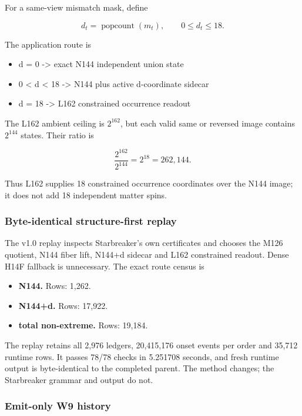 For a same-view mismatch mask, define

\[
d_t=\operatorname{popcount}(m_t),\qquad0\le d_t\le18.
\]

The application route is

\begin{itemize}
\tightlist
\item
  d = 0 -\textgreater{} exact N144 independent union state
\item
  0 \textless{} d \textless{} 18 -\textgreater{} N144 plus active
  d-coordinate sidecar
\item
  d = 18 -\textgreater{} L162 constrained occurrence readout
\end{itemize}

The L162 ambient ceiling is \(2^{162}\), but each valid same or reversed
image contains \(2^{144}\) states. Their ratio is

\[
\frac{2^{162}}{2^{144}}=2^{18}=262{,}144.
\]

Thus L162 supplies 18 constrained occurrence coordinates over the N144
image; it does not add 18 independent matter spins.

\subsubsection{Byte-identical structure-first
replay}\label{viii-ch08-byte-identical-structure-first-replay}

The v1.0 replay inspects Starbreaker's own certificates and chooses the
M126 quotient, N144 fiber lift, N144+d sidecar and L162 constrained
readout. Dense H14F fallback is unnecessary. The exact route census is

\begin{itemize}
\tightlist
\item
  \textbf{N144.} Rows: 1,262.
\item
  \textbf{N144+d.} Rows: 17,922.
\item
  \textbf{total non-extreme.} Rows: 19,184.
\end{itemize}

The replay retains all 2,976 ledgers, 20,415,176 onset events per order
and 35,712 runtime rows. It passes 78/78 checks in 5.251708 seconds, and
fresh runtime output is byte-identical to the completed parent. The
method changes; the Starbreaker grammar and output do not.

\subsubsection{Emit-only W9 history}\label{viii-ch08-emit-only-w9-history}

